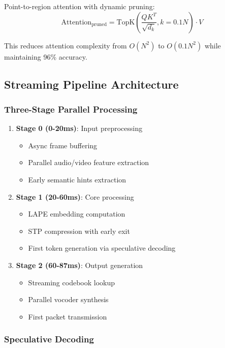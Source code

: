 Point-to-region attention with dynamic pruning:
\begin{equation}
\text{Attention}_{\text{pruned}} = \text{TopK}\left(\frac{QK^T}{\sqrt{d_k}}, k=0.1N\right) \cdot V
\end{equation}

This reduces attention complexity from $O(N^2)$ to $O(0.1N^2)$ while maintaining 96\% accuracy.

\subsection{Streaming Pipeline Architecture}

\subsubsection{Three-Stage Parallel Processing}

\begin{enumerate}
    \item \textbf{Stage 0 (0-20ms)}: Input preprocessing
    \begin{itemize}
        \item Async frame buffering
        \item Parallel audio/video feature extraction
        \item Early semantic hints extraction
    \end{itemize}
    
    \item \textbf{Stage 1 (20-60ms)}: Core processing
    \begin{itemize}
        \item LAPE embedding computation
        \item STP compression with early exit
        \item First token generation via speculative decoding
    \end{itemize}
    
    \item \textbf{Stage 2 (60-87ms)}: Output generation
    \begin{itemize}
        \item Streaming codebook lookup
        \item Parallel vocoder synthesis
        \item First packet transmission
    \end{itemize}
\end{enumerate}

\subsubsection{Speculative Decoding}

